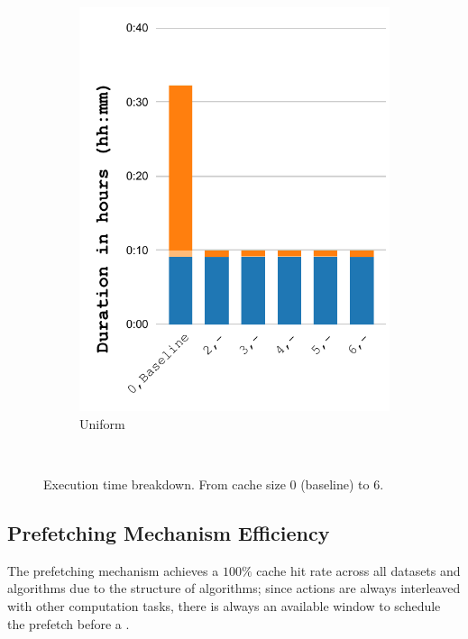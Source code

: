 \documentclass[Ingles]{ic-tese-v3}
\begin{document}
\begin{figure}[]
\begin{subfigure}{0.3\textwidth}
        \includegraphics[width=\textwidth,trim={0 0 0 0},clip]{figures/prefetch_breakdown/prefetch_breakdown_uniform_salt.pdf}
        \caption{Uniform}
        \label{fig:prefetch_breakdown_uniform}
    \end{subfigure}\\
    \caption[Execution time breakdown (\checkpointprefetching)]{Execution time breakdown. From cache size 0 (baseline) to 6.}
    \label{fig:prefetch_breakdown}
\end{figure}

\subsection{Prefetching Mechanism Efficiency}
\label{sec:prefeff}

The prefetching mechanism achieves a $100\%$ cache hit rate across all datasets and algorithms due to the structure of \checkpointing algorithms; since  \restore actions are always interleaved with other computation tasks, there is always an available window to schedule the prefetch before a \restore.
\end{document}
